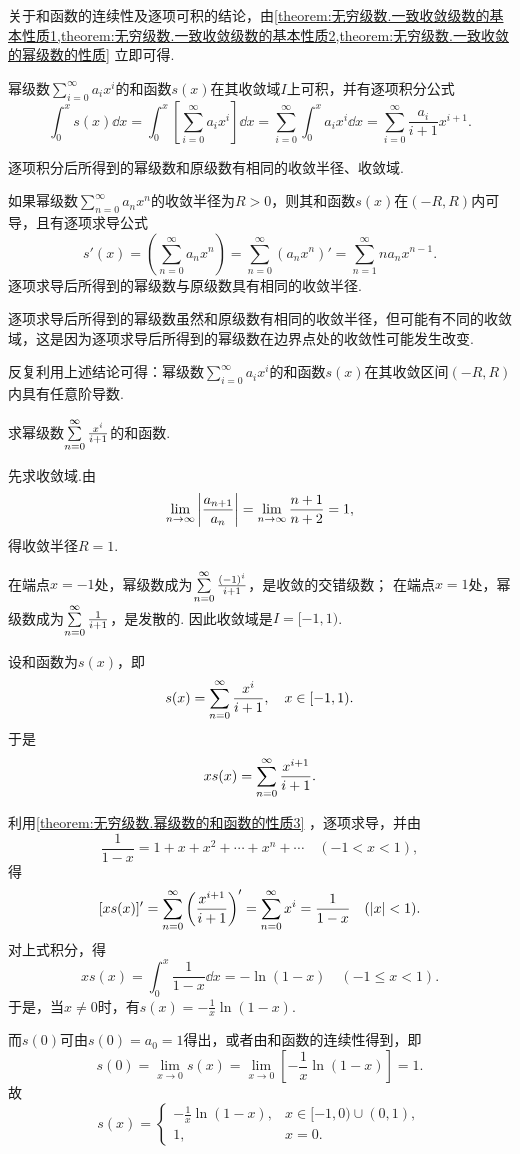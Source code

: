 关于和函数的连续性及逐项可积的结论，由\cref{theorem:无穷级数.一致收敛级数的基本性质1,theorem:无穷级数.一致收敛级数的基本性质2,theorem:无穷级数.一致收敛的幂级数的性质} 立即可得.

\begin{property}\label{theorem:无穷级数.幂级数的和函数的性质2}
幂级数\(\sum\limits_{i=0}^{\infty} a_i x^i\)的和函数\(s(x)\)在其收敛域\(I\)上可积，并有逐项积分公式\[
\int_0^x s(x) \dd{x}
=\int_0^x \left[\sum\limits_{i=0}^{\infty} a_i x^i\right] \dd{x}
=\sum\limits_{i=0}^{\infty} \int_0^x a_i x^i \dd{x}
=\sum\limits_{i=0}^{\infty} \frac{a_i}{i+1} x^{i+1}.
\]

逐项积分后所得到的幂级数和原级数有相同的收敛半径、收敛域.
\end{property}

\begin{property}\label{theorem:无穷级数.幂级数的和函数的性质3}
\def\s{\sum\limits_{n=0}^{\infty}}
如果幂级数\(\s a_n x^n\)的收敛半径为\(R>0\)，则其和函数\(s(x)\)在\((-R,R)\)内可导，且有逐项求导公式\[
s'(x) = \left( \s a_n x^n \right)
= \sum\limits_{n=0}^{\infty} (a_n x^n)'
= \sum\limits_{n=1}^{\infty} n a_n x^{n-1}.
\]逐项求导后所得到的幂级数与原级数具有相同的收敛半径.
\end{property}
逐项求导后所得到的幂级数虽然和原级数有相同的收敛半径，但可能有不同的收敛域，这是因为逐项求导后所得到的幂级数在边界点处的收敛性可能发生改变.

反复利用上述结论可得：幂级数\(\sum\limits_{i=0}^{\infty} a_i x^i\)的和函数\(s(x)\)在其收敛区间\((-R,R)\)内具有任意阶导数.


\begin{example}
求幂级数\(\s \frac{x^i}{i+1}\)的和函数.
\begin{solution}
先求收敛域.由\[
\lim\limits_{n\to\infty} \abs{\frac{a_{n+1}}{a_n}} = \lim\limits_{n\to\infty} \frac{n+1}{n+2} = 1,
\]得收敛半径\(R=1\).

在端点\(x = -1\)处，幂级数成为\(\s \frac{(-1)^i}{i+1}\)，是收敛的交错级数；
在端点\(x = 1\)处，幂级数成为\(\s \frac{1}{i+1}\)，是发散的.
因此收敛域是\(I = [-1,1)\).

设和函数为\(s(x)\)，即\[
s(x) = \s \frac{x^i}{i+1},
\quad x\in[-1,1).
\]于是\[
x s(x) = \s \frac{x^{i+1}}{i+1}.
\]

利用\cref{theorem:无穷级数.幂级数的和函数的性质3} ，逐项求导，并由\[
\frac{1}{1-x} = 1+x+x^2+\dotsb+x^n+\dotsb
\quad (-1<x<1),
\]得\[
[x s(x)]'
= \s \left( \frac{x^{i+1}}{i+1} \right)'
= \s x^i
= \frac{1}{1-x}
\quad (\abs{x}<1).
\]对上式积分，得\[
x s(x) = \int_0^x \frac{1}{1-x} \dd{x} = -\ln(1-x)
\quad (-1 \leqslant x < 1).
\]于是，当\(x\neq0\)时，有\(s(x) = -\frac{1}{x} \ln(1-x)\).

而\(s(0)\)可由\(s(0) = a_0 = 1\)得出，或者由和函数的连续性得到，即\[
s(0) = \lim\limits_{x\to0} s(x) = \lim\limits_{x\to0} \left[ -\frac{1}{x} \ln(1-x) \right] = 1.
\]故\[
s(x) = \left\{ \begin{array}{cl}
-\frac{1}{x} \ln(1-x), & x\in[-1,0)\cup(0,1), \\
1, & x=0.
\end{array} \right.
\]
\end{solution}
\end{example}

